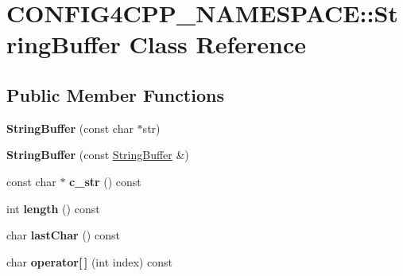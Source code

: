 \hypertarget{classCONFIG4CPP__NAMESPACE_1_1StringBuffer}{\section{C\-O\-N\-F\-I\-G4\-C\-P\-P\-\_\-\-N\-A\-M\-E\-S\-P\-A\-C\-E\-:\-:String\-Buffer Class Reference}
\label{classCONFIG4CPP__NAMESPACE_1_1StringBuffer}
}
\subsection*{Public Member Functions}
\begin{DoxyCompactItemize}
\item 
\hypertarget{classCONFIG4CPP__NAMESPACE_1_1StringBuffer_aa69b4b79593aa44b95c5604bfe466c64}{{\bfseries String\-Buffer} (const char $\ast$str)}\label{classCONFIG4CPP__NAMESPACE_1_1StringBuffer_aa69b4b79593aa44b95c5604bfe466c64}

\item 
\hypertarget{classCONFIG4CPP__NAMESPACE_1_1StringBuffer_aacb84273103682aae9f8c7599c025809}{{\bfseries String\-Buffer} (const \hyperlink{classCONFIG4CPP__NAMESPACE_1_1StringBuffer}{String\-Buffer} \&)}\label{classCONFIG4CPP__NAMESPACE_1_1StringBuffer_aacb84273103682aae9f8c7599c025809}

\item 
\hypertarget{classCONFIG4CPP__NAMESPACE_1_1StringBuffer_ac2cdace320a3130acbcfb02fc0f8b855}{const char $\ast$ {\bfseries c\-\_\-str} () const }\label{classCONFIG4CPP__NAMESPACE_1_1StringBuffer_ac2cdace320a3130acbcfb02fc0f8b855}

\item 
\hypertarget{classCONFIG4CPP__NAMESPACE_1_1StringBuffer_aab339657540223df95993790dc2d429d}{int {\bfseries length} () const }\label{classCONFIG4CPP__NAMESPACE_1_1StringBuffer_aab339657540223df95993790dc2d429d}

\item 
\hypertarget{classCONFIG4CPP__NAMESPACE_1_1StringBuffer_adf6d7a9296db401f539ae4e6e0fadd34}{char {\bfseries last\-Char} () const }\label{classCONFIG4CPP__NAMESPACE_1_1StringBuffer_adf6d7a9296db401f539ae4e6e0fadd34}

\item 
\hypertarget{classCONFIG4CPP__NAMESPACE_1_1StringBuffer_a0918825adbc686e63b946f9580b8419c}{char {\bfseries operator\mbox{[}$\,$\mbox{]}} (int index) const }\label{classCONFIG4CPP__NAMESPACE_1_1StringBuffer_a0918825adbc686e63b946f9580b8419c}


\end{DoxyCompactItemize}
